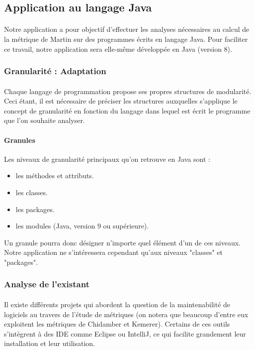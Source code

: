 \documentclass{scrartcl}
\begin{document}
\subsection{Application au langage Java}

    \paragraph{}Notre application a pour objectif d'effectuer les analyses nécessaires au calcul de la métrique de Martin sur des programmes écrits en langage Java. Pour faciliter ce travail, notre application sera elle-même développée en Java (version 8).

\subsubsection{Granularité : Adaptation}
    
    \paragraph{}Chaque langage de programmation propose ses propres structures de modularité. Ceci étant, il est nécessaire de préciser les structures auxquelles s'applique le concept de granularité en fonction du langage dans lequel est écrit le programme que l'on souhaite analyser.
    
    \paragraph{Granules}Les niveaux de granularité principaux qu'on retrouve en Java sont :
    \begin{itemize}
        \item les méthodes et attributs.
        \item les classes.
        \item les packages.
        \item les modules (Java, version 9 ou supérieure).
    \end{itemize}
    Un granule pourra donc désigner n'importe quel élément d'un de ces niveaux. Notre application ne s'intéressera cependant qu'aux niveaux "classes" et "packages".

\subsubsection{Analyse de l'existant}
\label{existingAnalysis}
    \paragraph{}Il existe différents projets qui abordent la question de la maintenabilité de logiciels au travers de l'étude de métriques (on notera que beaucoup d'entre eux exploitent les métriques de Chidamber et Kemerer\cite{ChidamberKemerer:1994}). Certains de ces outils s'intègrent à des IDE comme Eclipse ou IntelliJ, ce qui facilite grandement leur installation et leur utilisation.
    
\end{document}
